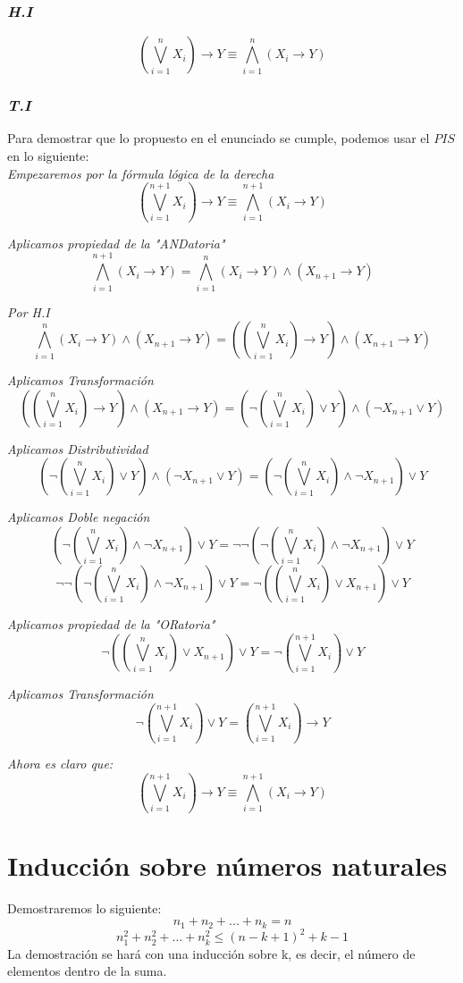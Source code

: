 \documentclass{article}
\begin{document}
\subsubsection*{\emph{H.I}}
\[ (\bigvee _{i=1}^{n} X_i) \rightarrow Y \equiv \bigwedge _{i=1}^{n} (X_i \rightarrow Y) \]

\subsubsection*{\emph{T.I}}
Para demostrar que lo propuesto en el enunciado se cumple, podemos usar el $PIS$ en lo siguiente:\\
\emph{Empezaremos por la fórmula lógica de la derecha}
\[ (\bigvee _{i=1}^{n+1} X_i) \rightarrow Y \equiv \bigwedge _{i=1}^{n+1} (X_i \rightarrow Y) \]

\emph{Aplicamos propiedad de la "ANDatoria"}
\[ \bigwedge _{i=1}^{n+1} (X_i \rightarrow Y) = \bigwedge _{i=1}^{n} (X_i \rightarrow Y) \land (X_{n+1} \rightarrow Y) \]

\emph{Por H.I}
\[ \bigwedge _{i=1}^{n} (X_i \rightarrow Y) \land (X_{n+1} \rightarrow Y) = ((\bigvee _{i=1}^{n} X_i) \rightarrow Y) \land (X_{n+1} \rightarrow Y) \] 

\emph{Aplicamos Transformación}
\[ ((\bigvee _{i=1}^{n} X_i) \rightarrow Y) \land (X_{n+1} \rightarrow Y) = (\neg(\bigvee _{i=1}^{n} X_i) \lor Y) \land (\neg X_{n+1} \lor Y) \]

\emph{Aplicamos Distributividad}
\[ (\neg(\bigvee _{i=1}^{n} X_i) \lor Y) \land (\neg X_{n+1} \lor Y) = (\neg(\bigvee _{i=1}^{n} X_i) \land \neg X_{n+1} ) \lor Y\]

\emph{Aplicamos Doble negación}
\[ (\neg(\bigvee _{i=1}^{n} X_i) \land \neg X_{n+1} ) \lor Y = \neg\neg(\neg(\bigvee _{i=1}^{n} X_i) \land \neg X_{n+1} ) \lor Y\] 
\[ \neg\neg(\neg(\bigvee _{i=1}^{n} X_i) \land \neg X_{n+1} ) \lor Y = \neg((\bigvee _{i=1}^{n} X_i) \lor  X_{n+1} )\lor Y \]

\emph{Aplicamos propiedad de la "ORatoria"}
\[ \neg((\bigvee _{i=1}^{n} X_i) \lor  X_{n+1}) \lor Y = \neg(\bigvee _{i=1}^{n+1} X_i) \lor Y \]

\emph{Aplicamos Transformación}
\[ \neg(\bigvee _{i=1}^{n+1} X_i) \lor Y = (\bigvee _{i=1}^{n+1} X_i) \rightarrow Y\]

\emph{Ahora es claro que:}
\[ (\bigvee _{i=1}^{n+1} X_i) \rightarrow Y \equiv \bigwedge _{i=1}^{n+1} (X_i \rightarrow Y) \]

\newpage
\section{Inducción sobre números naturales}
Demostraremos lo siguiente:
\[ n_1 + n_2 + ... + n_k = n \]
\[ n_1^2 + n_2^2 + ... + n_k^2 \leq (n-k+1)^2 + k -1\]
La demostración se hará con una inducción sobre k, es decir, el número de 
elementos dentro de la suma.
\end{document}
